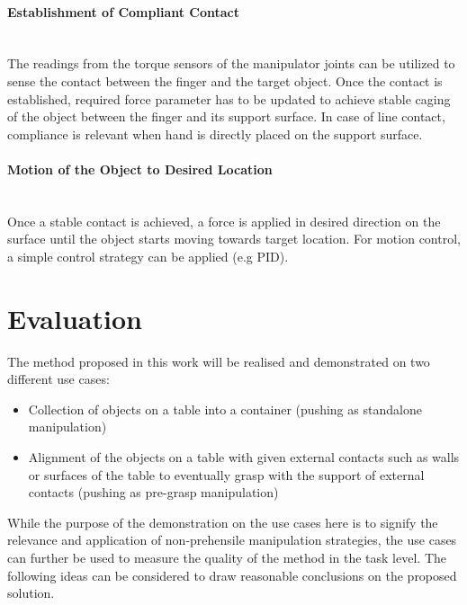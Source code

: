 \documentclass[rnd]{mas_proposal}
\begin{document}
\paragraph{Establishment of Compliant Contact}~\\
The readings from the torque sensors of the manipulator joints can be utilized to sense the contact between the finger and the target object. Once the contact is established, required force parameter has to be updated to achieve stable caging of the object between the finger and its support surface. In case of line contact, compliance is relevant when hand is directly placed on the support surface. 


\paragraph{Motion of the Object to Desired Location}~ \\
Once a stable contact is achieved, a force is applied in desired direction on the surface until the object starts moving towards target location. For motion control, a simple control strategy can be applied (e.g PID).
\newpage
\section{Evaluation}

The method proposed in this work will be realised and demonstrated on two different use cases:
\begin{itemize}
\item Collection of objects on a table into a container (pushing as standalone manipulation)
\item Alignment of the objects on a table with given external contacts such as walls or surfaces of the table to eventually grasp with the support of external contacts (pushing as pre-grasp manipulation)
\end{itemize}

While the purpose of the demonstration on the use cases here is to signify the relevance and application of non-prehensile manipulation strategies, the use cases can further be used to measure the quality of the method in the task level. The following ideas can be considered to draw reasonable conclusions on the proposed solution.
\end{document}

